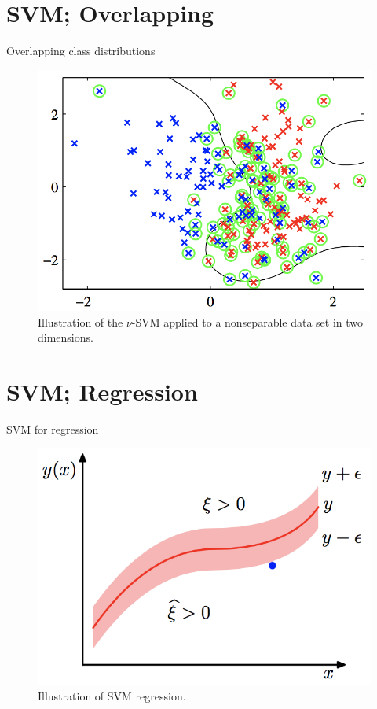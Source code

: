 \documentclass{bredelebeamer}
\begin{document}
\section{SVM; Overlapping}
\begin{frame}{Overlapping class distributions}
  \begin{figure}
  \centering
  \includegraphics[scale=0.35]{svm_overlapping.png}
  \caption{
    Illustration of the $\nu$-SVM applied to a nonseparable data set in two
    dimensions.
  }
  \end{figure}
\end{frame}

\section{SVM; Regression}
\begin{frame}{SVM for regression}
  \begin{figure}
  \centering
  \includegraphics[scale=0.35]{svm_for_reg.png}
  \caption{
    Illustration of SVM regression.
  }
  \end{figure}
\end{frame}
\end{document}

